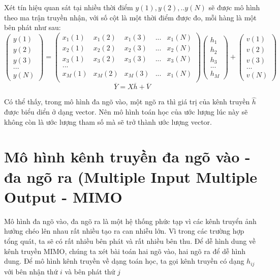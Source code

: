 \documentclass{article}
\begin{document}
Xét tín hiệu quan sát tại nhiều thời điểm $y(1), y(2),..y(N)$ sẽ được mô hình theo ma trận truyền nhận, với số cột là một thời điểm được đo, mỗi hàng là một bên phát như sau:
$$\begin{pmatrix}
    y(1)\\y(2)\\y(3)\\...\\y(N)
\end{pmatrix} = \begin{pmatrix}
    x_1(1)&x_1(2)&x_1(3)&...&x_1(N)\\
    x_2(1)&x_2(2)&x_2(3)&...&x_2(N)\\
    x_3(1)&x_3(2)&x_3(3)&...&x_3(N)\\
    ...\\
    x_M(1)&x_M(2)&x_M(3)&...&x_1(N)\\
\end{pmatrix} \begin{pmatrix}
    h_1\\h_2\\h_3\\...\\h_M
\end{pmatrix} + \begin{pmatrix}
    v(1)\\v(2)\\v(3)\\...\\v(N)
\end{pmatrix}$$
$$ \overline{Y} = X\overline{h} + \overline{V}$$

Có thể thấy, trong mô hình đa ngõ vào, một ngõ ra thì giá trị của kênh truyền $\hat{h}$ được biểu diển ở dạng vector. Nên mô hình toán học của ước lượng lúc này sẽ không còn là ước lượng tham số mà sẽ trở thành ước lượng vector.

\section{Mô hình kênh truyền đa ngõ vào - đa ngõ ra (Multiple Input Multiple Output - MIMO}
Mô hình đa ngõ vào, đa ngõ ra là một hệ thống phức tạp vì các kênh truyển ảnh hưởng chéo lên nhau rất nhiều tạo ra can nhiễu lớn. Vì trong các trường hợp tổng quát, ta sẽ có rất nhiều bên phát và rất nhiều bên thu. Để dễ hình dung về kênh truyền MIMO, chúng ta xét bài toán hai ngõ vào, hai ngõ ra để dễ hình dung. Để mô hình kênh truyền về dạng toán học, ta gọi kênh truyền có dạng $h_{ij}$ với bên nhận thứ $i$ và bên phát thứ $j$
\end{document}
